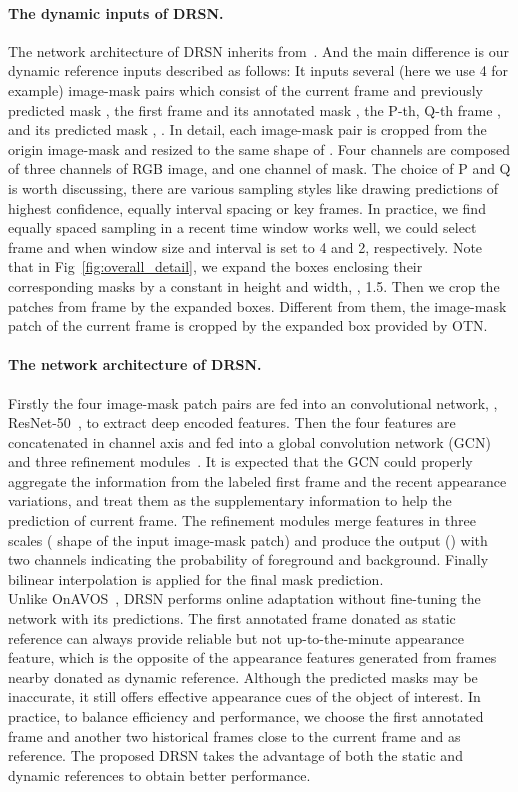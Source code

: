 \documentclass[10pt,twocolumn,letterpaper]{article}
\begin{document}
    \paragraph{The dynamic inputs of DRSN.}
    The network architecture of DRSN inherits from~\cite{rgmp_cvpr18}. And the main difference is our dynamic reference inputs described as follows: It inputs several (here we use 4 for example) image-mask pairs which consist of the current frame  and previously predicted mask , the first frame  and its annotated mask , the P-th, Q-th frame ,  and its predicted mask , . In detail, each image-mask pair is cropped from the origin image-mask and resized to the same shape of . Four channels are composed of three channels of RGB image, and one channel of mask. The choice of P and Q is worth discussing, there are various sampling styles like drawing predictions of highest confidence, equally interval spacing or key frames. In practice, we find equally spaced sampling in a recent time window works well, \ie we could select frame  and  when window size and interval is set to 4 and 2, respectively. Note that in Fig~\ref{fig:overall_detail}, we expand the boxes enclosing their corresponding masks by a constant in height and width, \eg, 1.5. Then we crop the patches from frame  by the expanded boxes. Different from them, the image-mask patch of the current frame  is cropped by the expanded box provided by OTN.

    \paragraph{The network architecture of DRSN.}
    Firstly the four image-mask patch pairs are fed into an convolutional network, \eg, ResNet-50~\cite{he2016deep}, to extract deep encoded features. Then the four features are concatenated in channel axis and fed into a global convolution network (GCN)~\cite{peng2017large} and three refinement modules~\cite{refinement_module_eccv16}. It is expected that the GCN could properly aggregate the information from the labeled first frame and the recent appearance variations, and treat them as the supplementary information to help the prediction of current frame. The refinement modules merge features in three scales ( shape of the input image-mask patch) and produce the output () with two channels indicating the probability of foreground and background. Finally bilinear interpolation is applied for the final mask prediction. 
\\

Unlike OnAVOS~\cite{onavos_bmvc17}, DRSN performs online adaptation without fine-tuning the network with its predictions. The first annotated frame donated as static reference can always provide reliable but not up-to-the-minute appearance feature, which is the opposite of the appearance features generated from frames nearby donated as dynamic reference. Although the predicted masks may be inaccurate, it still offers effective appearance cues of the object of interest. In practice, to balance efficiency and performance, we choose the first annotated frame and another two historical frames close to the current frame and as reference. The proposed DRSN takes the advantage of both the static and dynamic references to obtain better performance.
\end{document}
